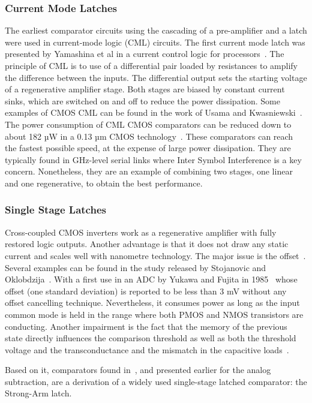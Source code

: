 \subsubsection{Current Mode Latches}
The earliest comparator circuits using the cascading of a pre-amplifier and a latch were used in current-mode logic (CML) circuits. The first current mode latch was presented by Yamashina et al in a current control logic for processors~\cite{Yamashina1994}. The principle of CML is to use of a differential pair loaded by resistances to amplify the difference between the inputs. The differential output sets the starting voltage of a regenerative amplifier stage. Both stages are biased by constant current sinks, which are switched on and off to reduce the power dissipation. Some examples of CMOS CML can be  found in the work of Usama and Kwasniewski~\cite{Usama2004}. The power consumption of CML CMOS comparators can be reduced down to about 182 µW in a 0.13 µm CMOS technology~\cite{Zhang2014cmp}. These comparators can reach the fastest possible speed, at the expense of large power dissipation. They are typically found in GHz-level serial links where Inter Symbol Interference is a key concern. Nonetheless, they are an example of combining two stages, one linear and one regenerative, to obtain the best performance.

\subsubsection{Single Stage Latches}
Cross-coupled CMOS inverters work as a regenerative amplifier with fully restored logic outputs. Another advantage is that it does not draw any static current and scales well with nanometre technology. The major issue is the offset~\cite{Hajimiri1998}. Several examples can be found in the study released by Stojanovic and Oklobdzija~\cite{Nikolic2000}. With a first use in an ADC by Yukawa and Fujita in 1985~\cite{Yukawa1985} whose offset (one standard deviation) is reported to be less than 3 mV without any offset cancelling technique. Nevertheless, it consumes power as long as the input common mode is held in the range where both PMOS and NMOS transistors are conducting. Another impairment is the fact that the memory of the previous state directly influences the comparison threshold as well as both the threshold voltage and the transconductance and the mismatch in the capacitive loads~\cite{Nikoozadeh2006}.

Based on it, comparators found in~\cite{Sumanen2000,Sumanen2002}, and presented earlier for the analog subtraction, are a derivation of a widely used single-stage latched comparator: the Strong-Arm latch.

